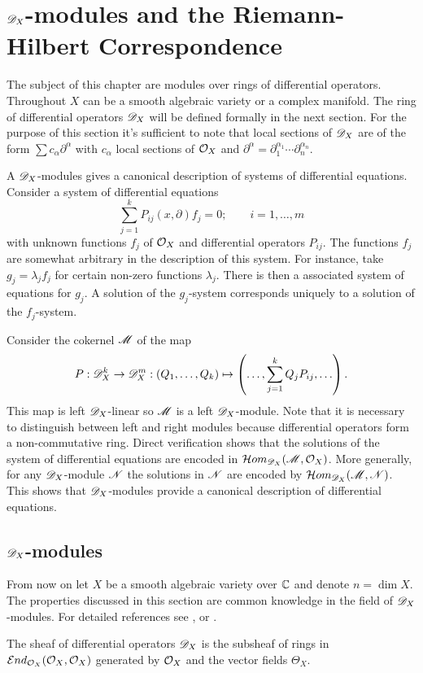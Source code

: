 \chapter{$\mathscr{D}_X$-modules and the Riemann-Hilbert Correspondence}\label{Ch: ChapterDX}
The subject of this chapter are modules over rings of differential operators.
Throughout $X$ can be a smooth algebraic variety or a complex manifold.
The ring of differential operators $\mathscr{D}_X$ will be defined formally in the next section.
For the purpose of this section it's sufficient to note that local sections of $\mathscr{D}_X$ are of the form $\sum c_{\alpha } \partial^\alpha$ with $c_{\alpha}$ local sections of $\mathcal{O}_X$ and $\partial^\alpha = \partial_1^{\alpha_1}\cdots \partial_n^{\alpha_n}$.

A $\mathscr{D}_X$-modules gives a canonical description of systems of differential equations.
Consider a system of differential equations
$$\sum_{j=1}^k P_{ij}(x,\partial) f_j = 0; \qquad i= 1,\ldots,m$$
with unknown functions $f_j$ of $\mathcal{O}_X$ and differential operators $P_{ij}$.
The functions $f_j$ are somewhat arbitrary in the description of this system.
For instance, take $g_j=\lambda_j f_j$ for certain non-zero functions $\lambda_j$.
There is then a associated system of equations for $g_j$.
A solution of the $g_j$-system corresponds uniquely to a solution of the $f_j$-system.

Consider the cokernel $\mathscr{M}$ of the map
$$P:\mathscr{D}_X^k \to \mathscr{D}_X^m : \left(Q_1,\ldots, Q_k\right) \mapsto \left(\ldots, \sum_{j=1}^k Q_j P_{ij},\ldots\right).$$
This map is left $\mathscr{D}_X$-linear so $\mathscr{M}$ is a left $\mathscr{D}_X$-module.
Note that it is necessary to distinguish between left and right modules because differential operators form a non-commutative ring.
Direct verification shows that the solutions of the system of differential equations are encoded in $\mathcal{H}om_{\mathscr{D}_X}(\mathscr{M},\mathcal{O}_X)$.
More generally, for any $\mathscr{D}_X$-module $\mathscr{N}$ the solutions in $\mathscr{N}$ are encoded by $\mathcal{H}om_{\mathscr{D}_X}(\mathscr{M},\mathscr{N})$.
This shows that $\mathscr{D}_X$-modules provide a canonical description of differential equations.
\section{$\mathscr{D}_X$-modules}
From now on let $X$ be a smooth algebraic variety over $\mathbb{C}$ and denote $n= \dim X$.
The properties discussed in this section are common knowledge in the field of $\mathscr{D}_X$-modules.
For detailed references see \cite{bjork1979rings}, \cite{kashiwara2003d} or \cite{hotta2007d}.

\begin{definition}
  The sheaf of differential operators $\mathscr{D}_X$ is the subsheaf of rings in $\mathcal{E}nd_{\mathcal{O}_X}(\mathcal{O}_X,\mathcal{O}_X)$ generated by $\mathcal{O}_X$ and the vector fields $\Theta_X$.
\end{definition}
